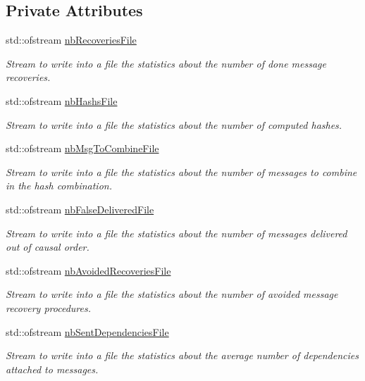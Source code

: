 \subsection*{Private Attributes}
\begin{DoxyCompactItemize}
\item 
std\+::ofstream \hyperlink{class_stats_a8c4fd9f4c18e074cbc4b69d611ec4977}{nb\+Recoveries\+File}
\begin{DoxyCompactList}\small\item\em Stream to write into a file the statistics about the number of done message recoveries. \end{DoxyCompactList}\item 
std\+::ofstream \hyperlink{class_stats_a47e0155a0aa3c62997eba6ebcdf77975}{nb\+Hashs\+File}
\begin{DoxyCompactList}\small\item\em Stream to write into a file the statistics about the number of computed hashes. \end{DoxyCompactList}\item 
std\+::ofstream \hyperlink{class_stats_aca527547cfdce19906610acd9a3d26ca}{nb\+Msg\+To\+Combine\+File}
\begin{DoxyCompactList}\small\item\em Stream to write into a file the statistics about the number of messages to combine in the hash combination. \end{DoxyCompactList}\item 
std\+::ofstream \hyperlink{class_stats_aded312adb1d366e759f216fc4f651b4c}{nb\+False\+Delivered\+File}
\begin{DoxyCompactList}\small\item\em Stream to write into a file the statistics about the number of messages delivered out of causal order. \end{DoxyCompactList}\item 
std\+::ofstream \hyperlink{class_stats_a2c1cbc31715b84b8e40206c5b3dc7c5f}{nb\+Avoided\+Recoveries\+File}
\begin{DoxyCompactList}\small\item\em Stream to write into a file the statistics about the number of avoided message recovery procedures. \end{DoxyCompactList}\item 
std\+::ofstream \hyperlink{class_stats_a26404a5110226c52970e3c261c6d8126}{nb\+Sent\+Dependencies\+File}
\begin{DoxyCompactList}\small\item\em Stream to write into a file the statistics about the average number of dependencies attached to messages. \end{DoxyCompactList}\item 

\end{DoxyCompactItemize}
